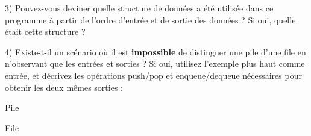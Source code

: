 \documentclass[11pt,a4paper]{article}
\begin{document}
3) Pouvez-vous deviner quelle structure de données a été utilisée dans ce programme à partir de l'ordre d'entrée et de sortie des données ?
Si oui, quelle était cette structure ?


\vspace*{1.5cm}


4) Existe-t-il un scénario où il est \textbf{impossible} de distinguer une pile d'une file en n'observant que les entrées et sorties ?
Si oui, utilisez l'exemple plus haut comme entrée, et décrivez les opérations push/pop et enqueue/dequeue nécessaires pour obtenir les deux mêmes sorties :

\begin{center}

\begin{table}[ht!]
  \centering
  \begin{minipage}{0.45\textwidth}
    \centering
Pile

\vspace*{6cm}

  \end{minipage}
  \hfillx
  \begin{minipage}{0.01\textwidth}


  \end{minipage}
  \hfillx
  \begin{minipage}{0.45\textwidth}
    \centering
File

\vspace*{6cm}

  \end{minipage}
\end{table}

\end{center}
\end{document}
